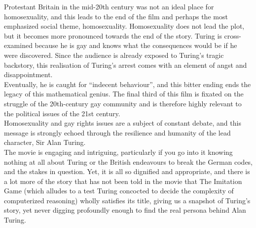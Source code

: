 \documentclass[a4paper, 12pt]{extarticle}
\begin{document}
Protestant Britain in the mid-20th century was not an ideal place for homosexuality, and  this leads to the end of the film and perhaps the most emphasized social theme, homosexuality. Homosexuality does not lead the plot, but it becomes more pronounced towards the end of the story. Turing is cross-examined because he is gay and knows what the consequences would be if he were discovered. Since the audience is already exposed to Turing’s tragic backstory, this realisation of Turing’s arrest comes with an element of angst and disappointment.\\

Eventually, he is caught for “indecent behaviour”, and this bitter ending ends the legacy of this mathematical genius. The final third of this film is fixated on the struggle of the 20th-century gay community and is therefore highly relevant to the political issues of the 21st century.\\

Homosexuality and gay rights issues are a subject of constant debate, and this message is strongly echoed through the resilience and humanity of the lead character, Sir Alan Turing.\\

The movie is engaging and intriguing, particularly if you go into it knowing nothing at all about Turing or the British endeavours to break the German codes, and the stakes in question. Yet, it is all so dignified and appropriate, and there is a lot more of the story that has not been told in the movie that The Imitation Game (which alludes to a test Turing concocted to decide the complexity of computerized reasoning) wholly satisfies its title, giving us a snapshot of Turing's story, yet never digging profoundly enough to find the real persona behind Alan Turing.
\end{document}
